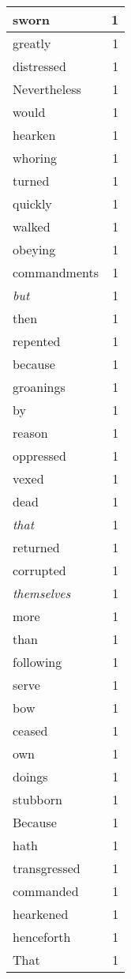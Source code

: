 \begin{center}
\begin{longtable}{l|r}
sworn & 1 \\ \hline
greatly & 1 \\ \hline
distressed & 1 \\ \hline
Nevertheless & 1 \\ \hline
would & 1 \\ \hline
hearken & 1 \\ \hline
whoring & 1 \\ \hline
turned & 1 \\ \hline
quickly & 1 \\ \hline
walked & 1 \\ \hline
obeying & 1 \\ \hline
commandments & 1 \\ \hline
\emph{but} & 1 \\ \hline
then & 1 \\ \hline
repented & 1 \\ \hline
because & 1 \\ \hline
groanings & 1 \\ \hline
by & 1 \\ \hline
reason & 1 \\ \hline
oppressed & 1 \\ \hline
vexed & 1 \\ \hline
dead & 1 \\ \hline
\emph{that} & 1 \\ \hline
returned & 1 \\ \hline
corrupted & 1 \\ \hline
\emph{themselves} & 1 \\ \hline
more & 1 \\ \hline
than & 1 \\ \hline
following & 1 \\ \hline
serve & 1 \\ \hline
bow & 1 \\ \hline
ceased & 1 \\ \hline
own & 1 \\ \hline
doings & 1 \\ \hline
stubborn & 1 \\ \hline
Because & 1 \\ \hline
hath & 1 \\ \hline
transgressed & 1 \\ \hline
commanded & 1 \\ \hline
hearkened & 1 \\ \hline
henceforth & 1 \\ \hline
That & 1 \\ \hline

\end{longtable}
\end{center}
